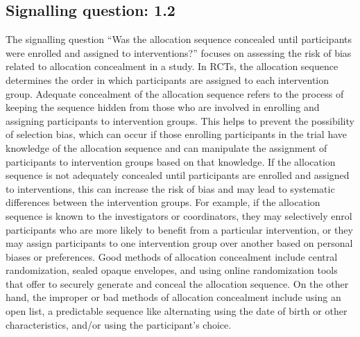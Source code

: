 \documentclass[sn-mathphys,Numbered]{sn-jnl}%
\begin{document}
\subsection*{Signalling question: 1.2}
%
The signalling question ``Was the allocation sequence concealed until participants were enrolled and assigned to interventions?'' focuses on assessing the risk of bias related to allocation concealment in a study. 
In RCTs, the allocation sequence determines the order in which participants are assigned to each intervention group.
Adequate concealment of the allocation sequence refers to the process of keeping the sequence hidden from those who are involved in enrolling and assigning participants to intervention groups.
This helps to prevent the possibility of selection bias, which can occur if those enrolling participants in the trial have knowledge of the allocation sequence and can manipulate the assignment of participants to intervention groups based on that knowledge.
If the allocation sequence is not adequately concealed until participants are enrolled and assigned to interventions, this can increase the risk of bias and may lead to systematic differences between the intervention groups.
For example, if the allocation sequence is known to the investigators or coordinators, they may selectively enrol participants who are more likely to benefit from a particular intervention, or they may assign participants to one intervention group over another based on personal biases or preferences.
Good methods of allocation concealment include central randomization, sealed opaque envelopes, and using online randomization tools that offer to securely generate and conceal the allocation sequence.
On the other hand, the improper or bad methods of allocation concealment include using an open list, a predictable sequence like alternating using the date of birth or other characteristics, and/or using the participant's choice.
\end{document}
